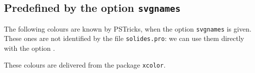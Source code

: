 






\egroup

\subsection{Predefined  by the option \texttt{svgnames}}

The following colours are known by PSTricks, when the option \texttt{svgnames} is given.
These ones are not identified by the file \texttt{solides.pro}: we can use them directly with the option .

\bgroup
\newcommand{\colorcone}[1]{%
\begin{pspicture}(-1.2,-1)(1.2,1)
\psframe(-1.2,-1)(1.2,1)
\psset{viewpoint=50 50 20 rtp2xyz,Decran=150,lightsrc=viewpoint}
\psSolid[object=cone,
    linewidth=0.07\pslinewidth,
    fillcolor=#1,
    ngrid=4 12,
    r=0.2,h=0.37,
    action=draw**](0,0,-0.05)
\rput(0,-0.75){\footnotesize \texttt{#1}}
\end{pspicture}
}


\parindent0pt

These colours are delivered from the package \texttt{xcolor}.
\bigskip

